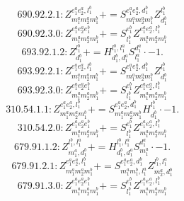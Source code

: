\documentclass[letterpaper,10pt,fleqn,leqno,onecolumn]{article}
\begin{document}
\begin{equation} \;\;\;\;\;\;  690.92.2.1: Z^{e_{1}^{a}e_{2}^{a},l_{1}^{b}}_{m_{1}^{a}m_{2}^{a}m_{1}^{b}}+=S^{e_{1}^{a}e_{2}^{a},d_{1}^{b}}_{m_{1}^{a}m_{2}^{a}m_{1}^{b}}Z^{l_{1}^{b}}_{d_{1}^{b}} \end{equation}
\begin{equation} \;\;\;\;\;\;  690.92.3.0: Z^{e_{1}^{a}e_{2}^{a}e_{1}^{b}}_{m_{1}^{a}m_{2}^{a}m_{1}^{b}}+=S^{e_{1}^{b}}_{l_{1}^{b}}Z^{e_{1}^{a}e_{2}^{a},l_{1}^{b}}_{m_{1}^{a}m_{2}^{a}m_{1}^{b}} \end{equation}
\begin{equation} \;\;\;\;\;\;  693.92.1.2: Z^{l_{1}^{b}}_{d_{1}^{b}}+=H^{l_{1}^{b},l_{1}^{a}}_{d_{1}^{b},d_{1}^{a}}S^{d_{1}^{a}}_{l_{1}^{a}}\cdot -1. \end{equation}
\begin{equation} \;\;\;\;\;\;  693.92.2.1: Z^{e_{1}^{a}e_{2}^{a},l_{1}^{b}}_{m_{1}^{a}m_{2}^{a}m_{1}^{b}}+=S^{e_{1}^{a}e_{2}^{a},d_{1}^{b}}_{m_{1}^{a}m_{2}^{a}m_{1}^{b}}Z^{l_{1}^{b}}_{d_{1}^{b}} \end{equation}
\begin{equation} \;\;\;\;\;\;  693.92.3.0: Z^{e_{1}^{a}e_{2}^{a}e_{1}^{b}}_{m_{1}^{a}m_{2}^{a}m_{1}^{b}}+=S^{e_{1}^{b}}_{l_{1}^{b}}Z^{e_{1}^{a}e_{2}^{a},l_{1}^{b}}_{m_{1}^{a}m_{2}^{a}m_{1}^{b}} \end{equation}
\begin{equation} \;\;\;\;\;\;  310.54.1.1: Z^{e_{1}^{a}e_{2}^{a},l_{1}^{b}}_{m_{1}^{a}m_{2}^{a}m_{1}^{b}}+=S^{e_{1}^{a}e_{2}^{a},d_{1}^{b}}_{m_{1}^{a}m_{2}^{a}m_{1}^{b}}H^{l_{1}^{b}}_{d_{1}^{b}}\cdot -1. \end{equation}
\begin{equation} \;\;\;\;\;\;  310.54.2.0: Z^{e_{1}^{a}e_{2}^{a}e_{1}^{b}}_{m_{1}^{a}m_{2}^{a}m_{1}^{b}}+=S^{e_{1}^{b}}_{l_{1}^{b}}Z^{e_{1}^{a}e_{2}^{a},l_{1}^{b}}_{m_{1}^{a}m_{2}^{a}m_{1}^{b}} \end{equation}
\begin{equation} \;\;\;\;\;\;  679.91.1.2: Z^{l_{1}^{b},l_{1}^{a}}_{m_{1}^{a},d_{1}^{b}}+=H^{l_{1}^{b},l_{1}^{a}}_{d_{1}^{b},d_{1}^{a}}S^{d_{1}^{a}}_{m_{1}^{a}}\cdot -1. \end{equation}
\begin{equation} \;\;\;\;\;\;  679.91.2.1: Z^{e_{1}^{a}e_{2}^{a},l_{1}^{b}}_{m_{1}^{a}m_{2}^{a}m_{1}^{b}}+=S^{e_{1}^{a}e_{2}^{a},d_{1}^{b}}_{m_{1}^{a}m_{1}^{b},l_{1}^{a}}Z^{l_{1}^{b},l_{1}^{a}}_{m_{2}^{a},d_{1}^{b}} \end{equation}
\begin{equation} \;\;\;\;\;\;  679.91.3.0: Z^{e_{1}^{a}e_{2}^{a}e_{1}^{b}}_{m_{1}^{a}m_{2}^{a}m_{1}^{b}}+=S^{e_{1}^{b}}_{l_{1}^{b}}Z^{e_{1}^{a}e_{2}^{a},l_{1}^{b}}_{m_{1}^{a}m_{2}^{a}m_{1}^{b}} \end{equation}
\end{document}
